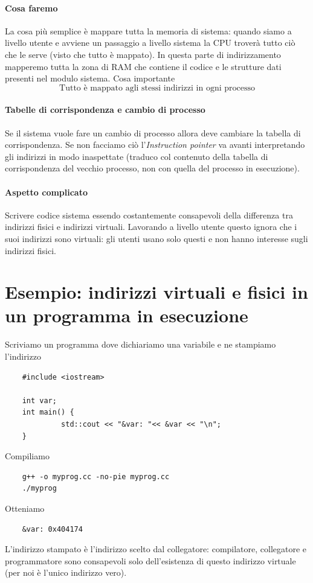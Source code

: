 \documentclass[11pt]{report}
\theoremstyle{definition}
\begin{document}
\paragraph{Cosa faremo} La cosa più semplice è mappare tutta la memoria di sistema: quando siamo a livello utente e avviene un passaggio a livello sistema la CPU troverà tutto ciò che le serve (visto che tutto è mappato). In questa parte di indirizzamento mapperemo tutta la zona di RAM che contiene il codice e le strutture dati presenti nel modulo sistema. Cosa importante
\[\boxed{\text{Tutto è mappato agli stessi indirizzi in ogni processo}}\]
\paragraph{Tabelle di corrispondenza e cambio di processo} Se il sistema vuole fare un cambio di processo allora deve cambiare la tabella di corrispondenza. Se non facciamo ciò l'\textit{Instruction pointer} va avanti interpretando gli indirizzi in modo inaspettate (traduco col contenuto della tabella di corrispondenza del vecchio processo, non con quella del processo in esecuzione).

\paragraph{Aspetto complicato} Scrivere codice sistema essendo costantemente consapevoli della differenza tra indirizzi fisici e indirizzi virtuali. Lavorando a livello utente questo ignora che i suoi indirizzi sono virtuali: gli utenti usano solo questi e non hanno interesse sugli indirizzi fisici.

\section{Esempio: indirizzi virtuali e fisici in un programma in esecuzione} 
Scriviamo un programma dove dichiariamo una variabile e ne stampiamo l'indirizzo
\begin{verbatim}
	#include <iostream>
	
	int var;
	int main() {
		     std::cout << "&var: "<< &var << "\n";
	}
\end{verbatim}
Compiliamo
\begin{verbatim}
	g++ -o myprog.cc -no-pie myprog.cc
	./myprog
\end{verbatim} 
Otteniamo
\begin{verbatim}
	&var: 0x404174
\end{verbatim}
L'indirizzo stampato è l'indirizzo scelto dal collegatore: compilatore, collegatore e programmatore sono consapevoli solo dell'esistenza di questo indirizzo virtuale (per noi è l'unico indirizzo vero).
\end{document}
